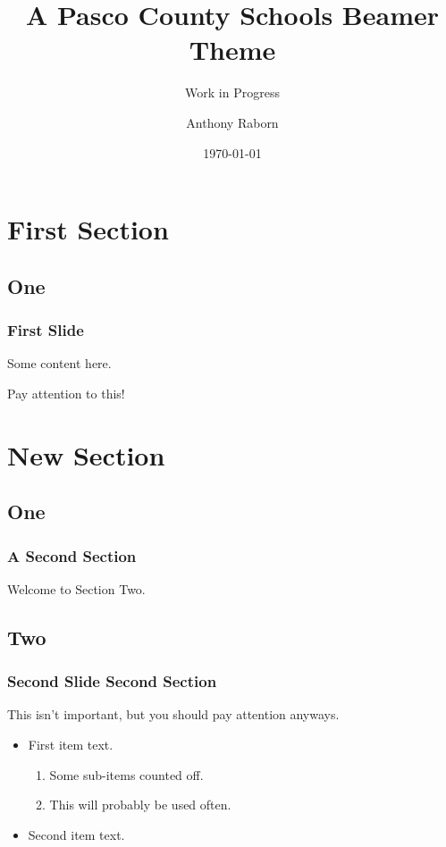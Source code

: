\documentclass{beamer}
\title[PSC Beamer Theme]{A Pasco County Schools Beamer Theme}
\subtitle{Work in Progress}
\author[A. Raborn]{Anthony Raborn}
\institute[PSC]{Pasco County Schools}
\date{\today}
\begin{document}
\begin{frame}
\titlepage
\end{frame}

\section{First Section}
\subsection{One}
\begin{frame}\frametitle{First Slide}
Some content here.

\alert{Pay attention to this!}
\end{frame}

\section{New Section}
\subsection{One}
\begin{frame}
\frametitle{A Second Section}
Welcome to Section Two.
\end{frame}

\subsection{Two}
\begin{frame}\frametitle{Second Slide Second Section}

This isn't important, but you should pay attention anyways.

\begin{itemize}
\item First item text.
	\begin{enumerate}
		\item Some sub-items counted off.
		\item This will probably be used often.
	\end{enumerate}
\item Second item text.
\end{itemize}

\end{frame}
\end{document}
